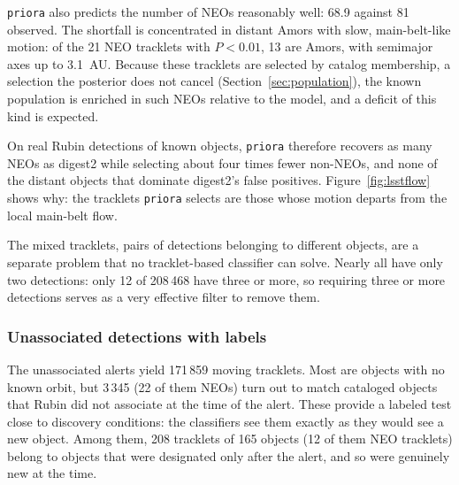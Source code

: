 \documentclass[linenumbers,twocolumn]{aastex701}
\newcommand{\priora}{{\tt priora}\xspace} %
\begin{document}
\priora also predicts the number of NEOs reasonably well: 68.9 against 81
observed. The shortfall is concentrated in distant Amors with slow,
main-belt-like motion: of the 21 NEO tracklets with $P<0.01$, 13 are Amors,
with semimajor axes up to 3.1~AU. Because these tracklets are selected by
catalog membership, a selection the posterior does not cancel
(Section~\ref{sec:population}), the known population is enriched in such
NEOs relative to the model, and a deficit of this kind is expected.

On real Rubin detections of known objects, \priora therefore recovers as many
NEOs as digest2 while selecting about four times fewer non-NEOs, and none
of the distant objects that dominate digest2's false positives. Figure~\ref{fig:lsstflow} shows why: the tracklets \priora{} selects are
those whose motion departs from the local main-belt flow.

The mixed tracklets, pairs of detections belonging to different objects, are a
separate problem that no tracklet-based classifier can solve. Nearly
all have only two detections: only 12 of 208\,468 have three or more, so
requiring three or more detections serves as a very effective filter to remove them.


\subsubsection{Unassociated detections with labels}
\label{sec:lsstunknown}

The unassociated alerts yield 171\,859 moving tracklets. Most are objects
with no known orbit, but 3\,345 (22 of them NEOs) turn out to match
cataloged objects that Rubin did not associate at the time of the alert.
These provide a labeled test close to discovery conditions: the
classifiers see them exactly as they would see a new object. Among them,
208 tracklets of 165 objects (12 of them NEO tracklets) belong to objects
that were designated only after the alert, and so were genuinely new at
the time.
\end{document}
